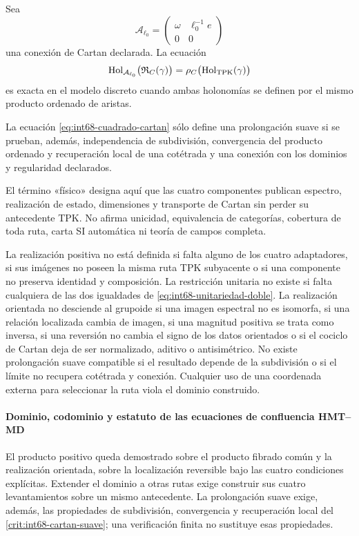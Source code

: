 Sea
\[
 \mathcal A_{\ell_0}
 =\begin{pmatrix}\omega&\ell_0^{-1}e\\0&0\end{pmatrix}
\]
una conexión de Cartan declarada. La ecuación
\begin{equation}
 \operatorname{Hol}_{\mathcal A_{\ell_0}}
   \bigl(\mathfrak R_C(\gamma)\bigr)
 =\rho_C\bigl(\operatorname{Hol}_{\rm TPK}(\gamma)\bigr)
 \label{eq:int68-cuadrado-cartan}
\end{equation}
es exacta en el modelo discreto cuando ambas holonomías se definen por el
mismo producto ordenado de aristas.

\begin{criterion}
\label{crit:int68-cartan-suave}
La ecuación \eqref{eq:int68-cuadrado-cartan} sólo define una prolongación
suave si se prueban, además, independencia de subdivisión, convergencia del
producto ordenado y recuperación local de una cotétrada y una conexión con
los dominios y regularidad declarados.
\end{criterion}

El término «físico» designa aquí que las cuatro componentes publican
espectro, realización de estado, dimensiones y transporte de Cartan sin
perder su antecedente TPK\@. No afirma unicidad, equivalencia de categorías,
cobertura de toda ruta, carta SI automática ni teoría de campos completa.

\begin{criterion}
\label{crit:int68-obstrucciones-realizacion}
La realización positiva no está definida si falta alguno de los cuatro
adaptadores, si sus imágenes no poseen la misma ruta TPK subyacente o si una
componente no preserva identidad y composición. La restricción unitaria no
existe si falta cualquiera de las dos igualdades de
\eqref{eq:int68-unitariedad-doble}. La realización orientada no desciende al
grupoide si una imagen espectral no es isomorfa, si una relación localizada
cambia de imagen, si una magnitud positiva se trata como inversa, si una
reversión no cambia el signo de los datos orientados o si el cociclo de
Cartan deja de ser normalizado, aditivo o antisimétrico. No existe
prolongación suave compatible si el resultado depende de la subdivisión o si
el límite no recupera cotétrada y conexión. Cualquier uso de una coordenada
externa para seleccionar la ruta viola el dominio construido.
\end{criterion}

\paragraph{Dominio, codominio y estatuto de las ecuaciones de confluencia HMT–MD}
El producto positivo queda demostrado sobre el producto fibrado común y la
realización orientada, sobre la localización reversible bajo las cuatro
condiciones explícitas. Extender el dominio a otras rutas exige construir sus
cuatro levantamientos sobre un mismo antecedente. La prolongación suave exige,
además, las propiedades de subdivisión, convergencia y recuperación local del
\cref{crit:int68-cartan-suave}; una verificación finita no sustituye esas
propiedades.
